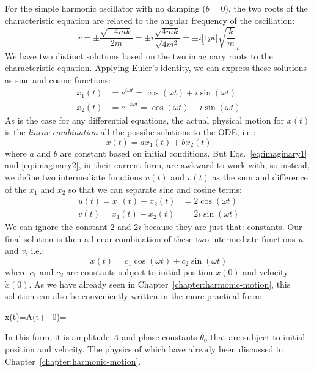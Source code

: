For the simple harmonic oscillator with no damping ($b=0$), the two roots of the
characteristic equation are related to the angular frequency of the oscillation:
\begin{equation*}
  r=\pm\frac{\sqrt{-4mk}}{2m}=\pm i\frac{\sqrt{4mk}}{\sqrt{4m^2}}
  =\pm i\underbracket[1pt]{\sqrt{\frac km}}_\omega
\end{equation*}
We have two distinct solutions based on the two imaginary roots to the
characteristic equation. Applying Euler's identity, we can express these
solutions as sine and cosine functions:
\begin{align}
  x_1(t) &= e^{i\omega t}=\cos(\omega t)+i\sin(\omega t) \label{eq:imaginary1}\\
  x_2(t) &= e^{-i\omega t}=\cos(\omega t)-i\sin(\omega t) \label{eq:imaginary2}
\end{align}
As is the case for any differential equations, the actual physical motion for
$x(t)$ is the \emph{linear combination} all the possibe solutions to the ODE,
i.e.:
\begin{equation*}
  x(t)=ax_1(t)+bx_2(t)
\end{equation*}
where $a$ and $b$ are constant based on initial conditions. But
Eqs.~\ref{eq:imaginary1} and \ref{eq:imaginary2}, in their current form, are
awkward to work with, so instead, we define two intermediate functions $u(t)$
and $v(t)$ as the sum and difference of the $x_1$ and $x_2$ so that we can
separate sine and cosine terms:
\begin{align*}
  u(t)=x_1(t)+x_2(t) &=2\cos(\omega t)\\
  v(t)=x_1(t)-x_2(t) &=2i\sin(\omega t)
\end{align*}
We can ignore the constant $2$ and $2i$ because they are just
that: constants. Our final solution is then a linear combination of these two
intermediate functions $u$ and $v$, i.e.:
\begin{equation}
  x(t)=c_1\cos(\omega t)+c_2\sin(\omega t)
\end{equation}
where $c_1$ and $c_2$ are constants subject to initial position $x(0)$ and
velocity $\dot x(0)$. As we have already seen in
Chapter~\ref{chapter:harmonic-motion}, this solution can also be conveniently
written in the more practical form:
\begin{important-equation}
  x(t)=A\cos(\omega t+\theta_0)\quad{}\quad \omega=
\end{important-equation}
In this form, it is amplitude $A$ and phase constants $\theta_0$ that are
subject to initial position and velocity. The physics of which have already been discussed in Chapter~\ref{chapter:harmonic-motion}.




